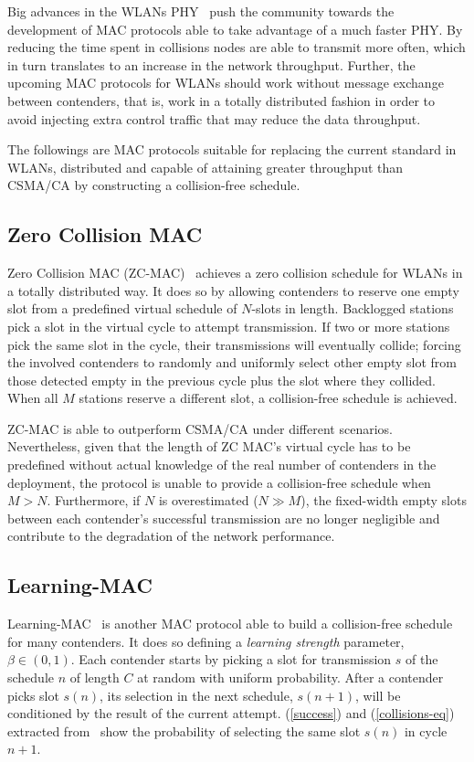 \documentclass[a4paper,journal]{IEEEtran}
\begin{document}
Big advances in the WLANs PHY~\cite{perahia2008ieee,6191306} push the community towards the development of MAC protocols able to take advantage of a much faster PHY. By reducing the time spent in collisions nodes are able to transmit more often, which in turn translates to an increase in the network throughput. Further, the upcoming MAC protocols for WLANs should work without message exchange between contenders, that is, work in a totally distributed fashion in order to avoid injecting extra control traffic that may reduce the data throughput.

The followings are MAC protocols suitable for replacing the current standard in WLANs, distributed and capable of attaining greater throughput than CSMA/CA by constructing a collision-free schedule.

\subsection{Zero Collision MAC} 

Zero Collision MAC (ZC-MAC)~\cite{ZMAC} achieves a zero collision schedule for WLANs in a totally distributed way. It does so by allowing contenders to reserve one empty slot from a  predefined virtual schedule of $N$-slots in length. Backlogged stations pick a slot in the virtual cycle to attempt transmission. If two or more stations pick the same slot in the cycle, their transmissions will eventually collide; forcing the involved contenders to randomly and uniformly select other empty slot from those detected empty in the previous cycle plus the slot where they collided. When all $M$ stations reserve a different slot, a collision-free schedule is achieved.

ZC-MAC is able to outperform CSMA/CA under different scenarios. Nevertheless, given that the length of ZC MAC's virtual cycle has to be predefined without actual knowledge of the real number of contenders in the deployment, the protocol is unable to provide a collision-free schedule when $M>N$. Furthermore, if $N$ is overestimated ($N\gg M$), the fixed-width empty slots between each contender's successful transmission are no longer negligible and contribute to the degradation of the network performance.

\subsection{Learning-MAC}

Learning-MAC~\cite{L_MAC} is another MAC protocol able to build a collision-free schedule for many contenders. It does so defining a \emph{learning strength} parameter, $\beta\in(0,1)$. Each contender starts by picking a slot for transmission $s$ of the schedule $n$ of length $C$ at random with uniform probability. After a contender picks slot $s(n)$, its selection in the next schedule, $s(n+1)$, will be conditioned by the result of the current attempt. (\ref{success}) and (\ref{collisions-eq}) extracted from~\cite{L_MAC} show the probability of selecting the same slot $s(n)$ in cycle $n+1$.
\end{document}
